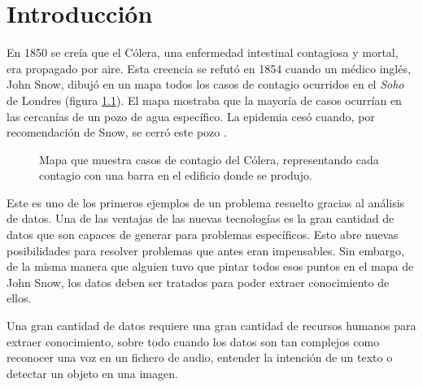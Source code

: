 
\chapter{Introducción} %
\label{Chapter1} %


\newcommand{\keyword}[1]{\textbf{#1}}
\newcommand{\tabhead}[1]{\textbf{#1}}
\newcommand{\code}[1]{\texttt{#1}}
\newcommand{\file}[1]{\texttt{\bfseries#1}}
\newcommand{\option}[1]{\texttt{\itshape#1}}

En 1850 se creía que el Cólera, una enfermedad intestinal contagiosa y mortal,
era propagado por aire. Esta creencia se refutó en 1854 cuando un médico
inglés, John Snow, dibujó en un mapa todos los casos de contagio ocurridos en
el \textit{Soho} de Londres (figura \ref{snow_map}). El mapa mostraba que la
mayoría de casos ocurrían en las cercanías de un pozo de agua específico. La
epidemia cesó cuando, por recomendación de Snow, se cerró este pozo
\parencite{snow}.

\begin{figure}
  \caption{Mapa que muestra casos de contagio del Cólera, representando cada contagio con una barra en el edificio donde se produjo.}
\label{snow_map}
\end{figure}

Este es uno de los primeros ejemplos de un problema resuelto gracias al
análisis de datos. Una de las ventajas de las nuevas tecnologías es la gran
cantidad de datos que son capaces de generar para problemas específicos. Esto
abre nuevas posibilidades para resolver problemas que antes eran impensables.
Sin embargo, de la misma manera que alguien tuvo que pintar todos esos puntos
en el mapa de John Snow, los datos deben ser tratados para poder extraer
conocimiento de ellos. 

Una gran cantidad de datos requiere una gran cantidad de recursos humanos para
extraer conocimiento, sobre todo cuando los datos son tan complejos
como reconocer una voz en un fichero de audio, entender la intención de un
texto o detectar un objeto en una imagen.

